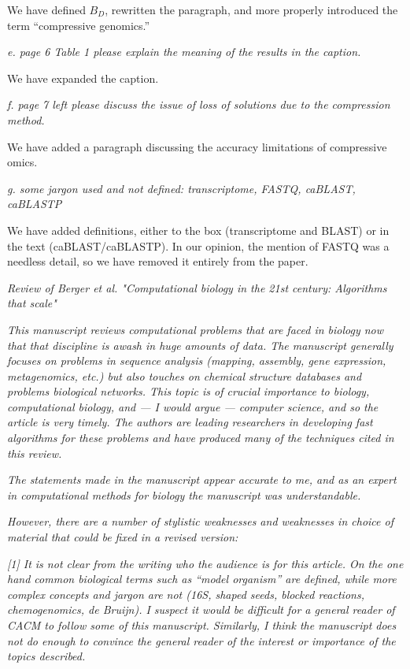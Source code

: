 \documentclass[12pt]{letter}
\begin{document}
\begin{letter}{}
We have defined $B_D$, rewritten the paragraph, and more properly introduced the term ``compressive genomics.''
 
\emph{e. page 6 Table 1 please explain the meaning of the results in the caption. }

We have expanded the caption.
 
\emph{f. page 7 left please discuss the issue of loss of solutions due to the compression method.}

We have added a paragraph discussing the accuracy limitations of compressive omics.
 
\emph{g. some jargon used and not defined: transcriptome, FASTQ, caBLAST, caBLASTP}

We have added definitions, either to the box (transcriptome and BLAST) or in the text (caBLAST/caBLASTP). In our opinion, the mention of FASTQ was a needless detail, so we have removed it entirely from the paper.

\emph{Review of Berger et al. "Computational biology in the 21st century: Algorithms
that scale"}

\emph{This manuscript reviews computational problems that are faced in biology now
that that discipline is awash in huge amounts of data.  The manuscript
generally focuses on problems in sequence analysis (mapping, assembly, gene
expression, metagenomics, etc.) but also touches on chemical structure
databases and problems biological networks. This topic is of crucial importance
to biology, computational biology, and --- I would argue --- computer science,
and so the article is very timely.  The authors are leading researchers in
developing fast algorithms for these problems and have produced many of the
techniques cited in this review.}

\emph{The statements made in the manuscript appear accurate to me, and as an expert
in computational methods for biology the manuscript was understandable.}

\emph{However, there are a number of stylistic weaknesses and weaknesses in choice of
material that could be fixed in a revised version:}

\emph{[1] It is not clear from the writing who the audience is for this article. On
the one hand common biological terms such as ``model organism'' are defined,
while more complex concepts and jargon are not (16S, shaped seeds, blocked
reactions, chemogenomics, de Bruijn). I suspect it would be difficult for a
general reader of CACM to follow some of this manuscript. Similarly, I think
the manuscript does not do enough to convince the general reader of the
interest or importance of the topics described.}


\end{letter}
\end{document}
